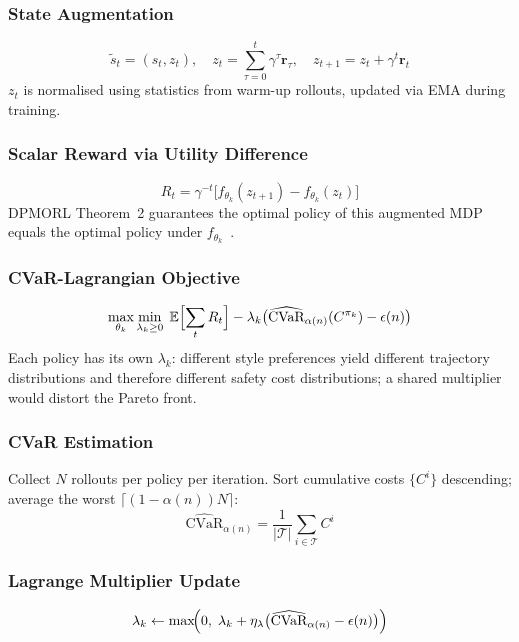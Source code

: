 \documentclass[conference]{IEEEtran}
\begin{document}
\subsubsection{State Augmentation}
\begin{equation}
\tilde{s}_{t}=(s_{t},z_{t}),\quad
z_{t}=\sum_{\tau=0}^{t}\gamma^{\tau}\mathbf{r}_{\tau},\quad
z_{t+1}=z_{t}+\gamma^{t}\mathbf{r}_{t}
\end{equation}
$z_{t}$ is normalised using statistics from warm-up rollouts,
updated via EMA during training.

\subsubsection{Scalar Reward via Utility Difference}
\begin{equation}
R_{t}=\gamma^{-t}\bigl[f_{\theta_{k}}(z_{t+1})-f_{\theta_{k}}(z_{t})\bigr]
\label{eq:scalar}
\end{equation}
DPMORL Theorem~2 guarantees the optimal policy of this augmented MDP
equals the optimal policy under $f_{\theta_{k}}$~\cite{DPMORL2023}.

\subsubsection{CVaR-Lagrangian Objective}
\begin{equation}
\max_{\theta_{k}}\min_{\lambda_{k}\geq0}\;
  \mathbb{E}\Bigl[\sum_{t}R_{t}\Bigr]
  -\lambda_{k}\bigl(\widehat{\text{CVaR}}_{\alpha(n)}(C^{\pi_{k}})-\epsilon(n)\bigr)
\label{eq:lagrangian}
\end{equation}
Each policy has its own $\lambda_{k}$: different style preferences yield
different trajectory distributions and therefore different safety cost
distributions; a shared multiplier would distort the Pareto front.

\subsubsection{CVaR Estimation}

Collect $N$ rollouts per policy per iteration. Sort cumulative costs
$\{C^{i}\}$ descending; average the worst
$\lceil(1-\alpha(n))N\rceil$:
\begin{equation}
\widehat{\text{CVaR}}_{\alpha(n)}=
  \frac{1}{|\mathcal{T}|}\sum_{i\in\mathcal{T}}C^{i}
\end{equation}

\subsubsection{Lagrange Multiplier Update}
\begin{equation}
\lambda_{k}\leftarrow\max\!\Bigl(0,\;
  \lambda_{k}+\eta_{\lambda}\bigl(
    \widehat{\text{CVaR}}_{\alpha(n)}-\epsilon(n)\bigr)\Bigr)
\label{eq:lambda}
\end{equation}
\end{document}
